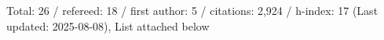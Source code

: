 Total: 26 / refereed: 18 / first author: 5 / citations: 2,924 / h-index: 17 (Last updated: 2025-08-08), List attached below
